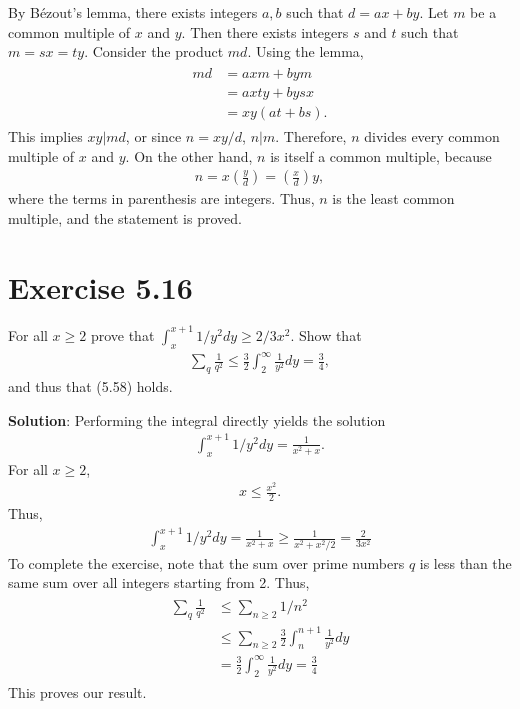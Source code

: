 \documentclass{book}
\begin{document}
    By Bézout's lemma, there exists integers $a,b$ such that $d = ax + by$. Let $m$ be a common multiple of $x$ and $y$. Then there exists integers $s$ and $t$ such that $m=sx=ty$. Consider the product $md$. Using the lemma,
    \begin{align}
    \begin{aligned}
        md &= axm+bym \\
        &= axty + bysx \\
        &= xy(at+bs).
    \end{aligned}
    \end{align}
    This implies $xy|md$, or since $n = xy/d$, $n|m$. Therefore, $n$ divides every common multiple of $x$ and $y$. On the other hand, $n$ is itself a common multiple, because 
    \begin{align}
        n = x \left(\frac{y}{d}\right) = \left(\frac{x}{d}\right)y,
    \end{align}
    where the terms in parenthesis are integers. Thus, $n$ is the least common multiple, and the statement is proved.
    
\section*{Exercise 5.16}
    For all $x\geq 2$ prove that $\int_x^{x+1} 1/y^2 dy \geq 2/3x^2$. Show that
    \begin{align}
        \sum_q \frac{1}{q^2} \leq \frac{3}{2}\int_2^\infty \frac{1}{y^2} dy =\frac{3}{4},
    \end{align}
    and thus that (5.58) holds.
    
    \textbf{Solution}: Performing the integral directly yields the solution
    \begin{align}
        \int_x^{x+1}1/y^2 dy = \frac{1}{x^2+x}.
    \end{align}
    For all $x\geq 2$,
    \begin{align}
        x \leq \frac{x^2}{2}.
    \end{align}
    Thus,
    \begin{align}
        \int_x^{x+1} 1/y^2 dy = \frac{1}{x^2+x} \geq \frac{1}{x^2 + x^2/2} = \frac{2}{3x^2}
    \end{align}
    To complete the exercise, note that the sum over prime numbers $q$ is less than the same sum over all integers starting from 2. Thus,
    \begin{align}
    \begin{aligned}
        \sum_q \frac{1}{q^2} &\leq \sum_{n\geq 2} 1/n^2 \\
        &\leq \sum_{n\geq 2} \frac{3}{2}\int_{n}^{n+1} \frac{1}{y^2} dy \\
        &= \frac{3}{2} \int_2^{\infty}\frac{1}{y^2} dy = \frac{3}{4}
    \end{aligned}
    \end{align}
    This proves our result.
    
\end{document}
